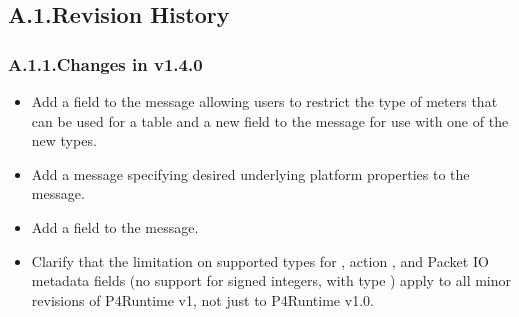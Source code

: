\documentclass[11pt]{article}
\begin{document}
{%
\subsection{A.1.\hspace*{0.5em}Revision History}\label{sec-revision-history}%

\subsubsection{A.1.1.\hspace*{0.5em}Changes in v1.4.0}\label{sec-changes-in-v140}%

\begin{itemize}[noitemsep,topsep=\mdcompacttopsep]%

\item{}Add a  field to the  message allowing users to restrict the
type of meters that can be used for a table and a new  field to the
 message for use with one of the new  types.%

\item{}Add a  message specifying desired underlying platform
properties to the  message.%

\item{}Add a  field to the  message.%

\item{}Clarify that the limitation on supported types for , action
, and Packet IO metadata fields (no support for signed integers, with
type ) apply to all minor revisions of P4Runtime v1, not just to
P4Runtime v1.0.%


\end{itemize}}
\end{document}
